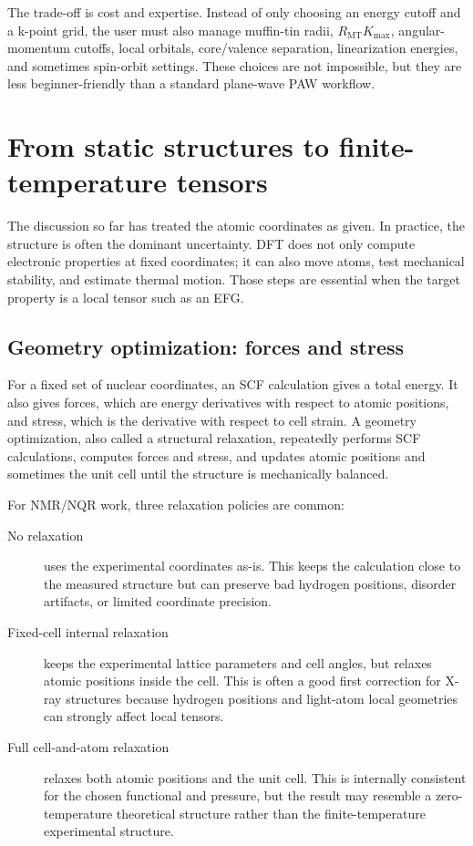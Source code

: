 \documentclass[11pt]{article}
\newcommand{\RMT}{R_{\mathrm{MT}}}
\begin{document}
The trade-off is cost and expertise.  Instead of only choosing an energy cutoff and a k-point grid, the user must also manage muffin-tin radii, $\RMT K_{\max}$, angular-momentum cutoffs, local orbitals, core/valence separation, linearization energies, and sometimes spin-orbit settings.  These choices are not impossible, but they are less beginner-friendly than a standard plane-wave PAW workflow.

\section{From static structures to finite-temperature tensors}
\label{sec:relax-phonons}

The discussion so far has treated the atomic coordinates as given.  In practice, the structure is often the dominant uncertainty.  DFT does not only compute electronic properties at fixed coordinates; it can also move atoms, test mechanical stability, and estimate thermal motion.  Those steps are essential when the target property is a local tensor such as an EFG.

\subsection{Geometry optimization: forces and stress}

For a fixed set of nuclear coordinates, an SCF calculation gives a total energy.  It also gives forces, which are energy derivatives with respect to atomic positions, and stress, which is the derivative with respect to cell strain.  A geometry optimization, also called a structural relaxation, repeatedly performs SCF calculations, computes forces and stress, and updates atomic positions and sometimes the unit cell until the structure is mechanically balanced.

For NMR/NQR work, three relaxation policies are common:
\begin{description}
\item[No relaxation] uses the experimental coordinates as-is.  This keeps the calculation close to the measured structure but can preserve bad hydrogen positions, disorder artifacts, or limited coordinate precision.
\item[Fixed-cell internal relaxation] keeps the experimental lattice parameters and cell angles, but relaxes atomic positions inside the cell.  This is often a good first correction for X-ray structures because hydrogen positions and light-atom local geometries can strongly affect local tensors.
\item[Full cell-and-atom relaxation] relaxes both atomic positions and the unit cell.  This is internally consistent for the chosen functional and pressure, but the result may resemble a zero-temperature theoretical structure rather than the finite-temperature experimental structure.
\end{description}
\end{document}

